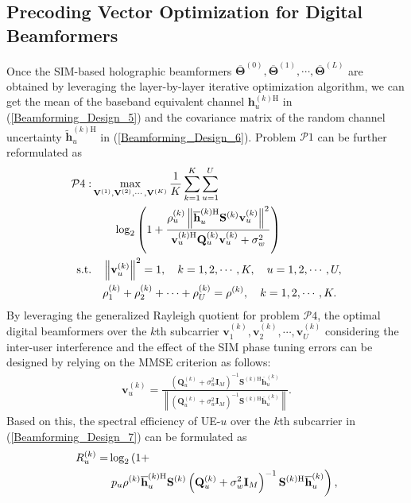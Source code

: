 \documentclass[lettersize,journal]{IEEEtran}
\theoremstyle{remark}
\begin{document}
\subsection{Precoding Vector Optimization for Digital Beamformers}
Once the SIM-based holographic beamformers $\overline{\mathbf{\Theta}}^{(0)},\overline{\mathbf{\Theta}}^{(1)},\cdots,
\overline{\mathbf{\Theta}}^{(L)}$ are obtained by leveraging the layer-by-layer iterative optimization algorithm, we can get the mean of the baseband equivalent channel $\mathbf{h}_u^{(k)\mathrm{H}}$ in (\ref{Beamforming_Design_5}) and the covariance matrix of the random channel uncertainty $\widetilde{\mathbf{h}}_u^{(k)\mathrm{H}}$ in (\ref{Beamforming_Design_6}). Problem $\mathcal{P}\mathrm{1}$ can be further reformulated as
\begin{align}\label{Beamforming_Design_9}
    \notag\mathcal{P}\mathrm{4}:&\max_{\mathbf{V}^{(1)},\mathbf{V}^{(2)},\cdots,\mathbf{V}^{(K)}}
    \frac{1}{K}\sum_{k=1}^{K}\sum_{u=1}^{U}\\
    &\qquad\log_2\left(1+\frac{\rho_u^{(k)}\left\|\overline{\mathbf{h}}_u^{(k)\mathrm{H}}
    \mathbf{S}^{(k)}\mathbf{v}_u^{(k)}\right\|^2}{\mathbf{v}_u^{(k)\mathrm{H}}
    \mathbf{Q}_u^{(k)}\mathbf{v}_u^{(k)}+\sigma_w^2}\right)\\
    \text{s.t.}&\quad \left\|\mathbf{v}_u^{(k)}\right\|^2=1,\quad k=1,2,\cdots,K,\quad u=1,2,\cdots,U,\\
    &\quad \rho_1^{(k)}+\rho_2^{(k)}+\cdots+\rho_U^{(k)}=\rho^{(k)},\quad k=1,2,\cdots,K.
\end{align}
By leveraging the generalized Rayleigh quotient for problem $\mathcal{P}\mathrm{4}$, the optimal digital beamformers over the $k$th subcarrier $\mathbf{v}_1^{(k)},\mathbf{v}_2^{(k)},\cdots,\mathbf{v}_U^{(k)}$ considering the inter-user interference and the effect of the SIM phase tuning errors can be designed by relying on the MMSE criterion as follows:
\begin{align}\label{Beamforming_Design_9_2}
    \mathbf{v}_u^{(k)}=\frac{\left(\mathbf{Q}_u^{(k)}+\sigma_w^2\mathbf{I}_M\right)^{-1}
    \mathbf{S}^{(k)\mathrm{H}}
    \overline{\mathbf{h}}_u^{(k)}}{\left\|\left(\mathbf{Q}_u^{(k)}+\sigma_w^2\mathbf{I}_M\right)^{-1}
    \mathbf{S}^{(k)\mathrm{H}}\overline{\mathbf{h}}_u^{(k)}\right\|}.
\end{align}
Based on this, the spectral efficiency of UE-$u$ over the $k$th subcarrier in (\ref{Beamforming_Design_7}) can be formulated as
\begin{align}\label{Power_Allocation_1}
    \notag R_u^{(k)}=&\log_2\left(1+\right.\\
    &\left. p_u\rho^{(k)}\overline{\mathbf{h}}_u^{(k)\mathrm{H}}
    \mathbf{S}^{(k)}\left(\mathbf{Q}_u^{(k)}+\sigma_w^2\mathbf{I}_M\right)^{-1}
    \mathbf{S}^{(k)\mathrm{H}}\overline{\mathbf{h}}_u^{(k)}\right),
\end{align}
\end{document}
